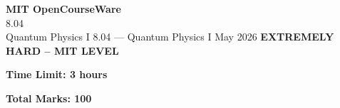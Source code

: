 \documentclass[12pt,a4paper]{exam}
\begin{document}
\begin{center}
{\LARGE \textbf{MIT OpenCourseWare}}\\8.04\\Quantum Physics I
\vspace{0.5cm}
{8.04} --- {Quantum Physics I}
\vspace{0.3cm}
May 2026
\vspace{0.3cm}
\textbf{EXTREMELY HARD -- MIT LEVEL}
\end{center}

\begin{center}
\textbf{Time Limit: 3 hours}
\end{center}

\begin{center}
\textbf{Total Marks: 100}
\end{center}

\vspace{0.5cm}
\end{document}
